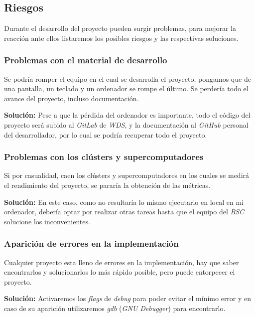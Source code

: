\subsection{Riesgos}

Durante el desarrollo del proyecto pueden surgir problemas, para mejorar la reacción ante ellos listaremos los posibles riesgos y las respectivas soluciones.

\subsubsection{Problemas con el material de desarrollo}

Se podría romper el equipo en el cual se desarrolla el proyecto, pongamos que de una pantalla, un teclado y un ordenador se rompe el último. Se perdería todo el avance del proyecto, incluso documentación.
\par\medskip

\textbf{Solución:} Pese a que la pérdida del ordenador es importante, todo el código del proyecto será subido al \textit{GitLab} de \textit{WDS}, y la documentación al \textit{GitHub} personal del desarrollador, por lo cual se podría recuperar todo el  proyecto.

\subsubsection{Problemas con los clústers y supercomputadores}

Si por casualidad, caen los clústers y supercomputadores en los cuales se medirá el rendimiento del proyecto, se pararía la obtención de las métricas. 
\par\medskip

\textbf{Solución:} En este caso, como no resultaría lo mismo ejecutarlo en local en mi ordenador, debería optar por realizar otras tareas hasta que el equipo del \textit{BSC} solucione los inconvenientes.

\subsubsection{Aparición de errores en la implementación}

Cualquier proyecto esta lleno de errores en la implementación, hay que saber encontrarlos y solucionarlos lo más rápido posible, pero puede entorpecer el proyecto.
\par\medskip

\textbf{Solución:} Activaremos los \textit{flags} de \textit{debug} para poder evitar el mínimo error y en caso de su aparición utilizaremos \textit{gdb} (\textit{GNU Debugger}) para encontrarlo.

